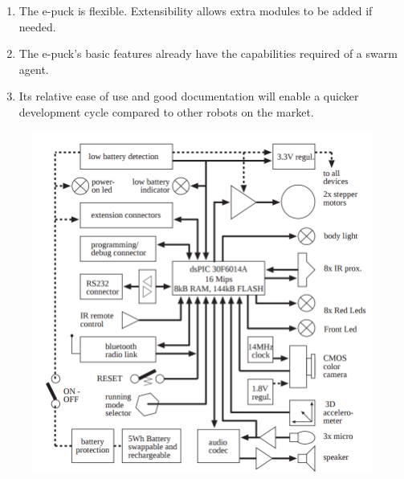 \begin{enumerate}
	\item The e-puck is flexible. Extensibility allows extra modules to be added if needed.
	\item The e-puck's basic features already have the capabilities required of a swarm agent.
	\item Its relative ease of use and good documentation will enable a quicker development cycle compared to other robots on the market.
\end{enumerate}

\begin{figure}
	\begin{minipage}{.75\textwidth}
		\centering
		\includegraphics[width=1.1\linewidth]{electronics.png}
		\label{fig:epuck-elec}
	\end{minipage}
\end{figure}

